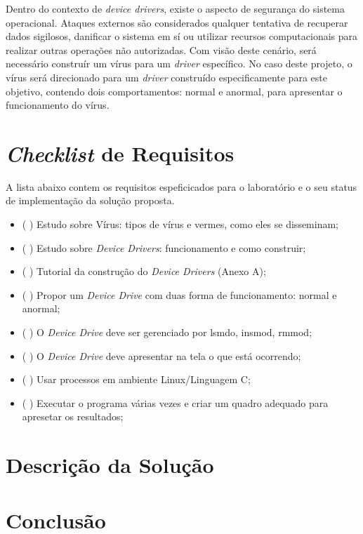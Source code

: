 Dentro do contexto de \textit{device drivers}, existe o aspecto de segurança do sistema operacional.
Ataques externos são considerados qualquer tentativa de recuperar dados sigilosos, danificar
o sistema em sí ou utilizar recursos computacionais para realizar outras operações não autorizadas.
Com visão deste cenário, será necessário construír um vírus para um \textit{driver} específico.
No caso deste projeto, o vírus será direcionado para um \textit{driver} construído especificamente para
este objetivo, contendo dois comportamentos: normal e anormal, para apresentar o
funcionamento do vírus.

\section{\textit{Checklist} de Requisitos}

A lista abaixo contem os requisitos espeficicados para o laboratório e o
seu status de implementação da solução proposta.

\begin{itemize}
  \item (  ) Estudo sobre Vírus: tipos de vírus e vermes, como eles se disseminam;
  \item (  ) Estudo sobre \textit{Device Drivers}: funcionamento e como construir;
  \item (  ) Tutorial da construção do \textit{Device Drivers} (Anexo A);
  \item (  ) Propor um \textit{Device Drive} com duas forma de funcionamento: normal e anormal;
  \item (  ) O \textit{Device Drive} deve ser gerenciado por lsmdo, insmod, rmmod;
  \item (  ) O \textit{Device Drive} deve apresentar na tela o que está ocorrendo;
  \item (  ) Usar processos em ambiente Linux/Linguagem C;
  \item (  ) Executar o programa várias vezes e criar um quadro adequado para apresetar os resultados;
\end{itemize}

\section{Descrição da Solução}

\section{Conclusão}


